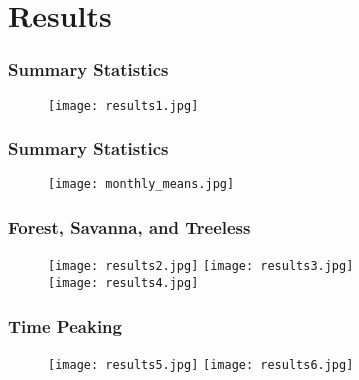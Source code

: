 \documentclass[11pt]{beamer}
\begin{document}
\section{Results}

\begin{frame}[fragile]
  \frametitle{\normalsize{\textbf{
    Summary Statistics
  }}} 

  \scriptsize{  

    \begin{figure}[h!]
      \centering
      \texttt{[image: results1.jpg]} \\
    \end{figure}

  }
\end{frame}

\begin{frame}[fragile]
  \frametitle{\normalsize{\textbf{
    Summary Statistics
  }}} 

  \scriptsize{  

    \begin{figure}[h!]
      \centering
      \texttt{[image: monthly\_means.jpg]} \\
    \end{figure}

  }
\end{frame}

\begin{frame}[fragile]
  \frametitle{\normalsize{\textbf{
    Forest, Savanna, and Treeless 
  }}} 

  \scriptsize{  

    \begin{figure}[h!]
      \centering
      \texttt{[image: results2.jpg]}
      \texttt{[image: results3.jpg]} \\
      \texttt{[image: results4.jpg]}
    \end{figure}
  
  }
\end{frame}

\begin{frame}[fragile]
  \frametitle{\normalsize{\textbf{
    Time Peaking
  }}} 

  \scriptsize{  

    \begin{figure}[h!]
      \centering
      \texttt{[image: results5.jpg]}
      \texttt{[image: results6.jpg]}
    \end{figure}

  }
\end{frame}
\end{document}

